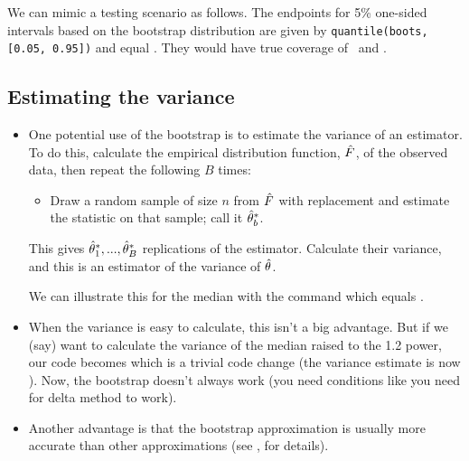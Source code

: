 \begin{itemize}[leftmargin=0pt]
  \renewcommand*\FancyVerbStartString{## block 1}

  We can mimic a testing scenario as follows.
  \renewcommand*\FancyVerbStartString{## block 3}
  The endpoints for 5\% one-sided intervals based on the bootstrap
  distribution are given by \verb|quantile(boots, [0.05, 0.95])| and
  equal \bootquantiles.  They would have true coverage of \bootleft\
  and \bootright.

\end{itemize}

\subsection{Estimating the variance}

\begin{itemize}[leftmargin=0pt]

\item One potential use of the bootstrap is to estimate the variance
  of an estimator.  To do this, calculate the empirical distribution
  function, $\hat{F}$, of the observed data, then repeat the following $B$
  times:
  \begin{itemize}
  \item Draw a random sample of size $n$ from $\hat{F}$ with replacement
    and estimate the statistic on that sample; call it $\hat{\theta}^*_b$.
  \end{itemize}
  This gives $\hat{\theta}^*_1,...,\hat{\theta}^*_B$ replications of the estimator.
  Calculate their variance, and this is an estimator of the variance
  of $\hat{\theta}$.

  We can illustrate this for the median with the command
  \renewcommand*\FancyVerbStartString{## block 4}
  which equals \medv.

\item When the variance is easy to calculate, this isn't a big
  advantage.  But if we (say) want to calculate the variance of the
  median raised to the 1.2 power, our code becomes
  \renewcommand*\FancyVerbStartString{## block 5}
  which is a trivial code change (the variance estimate is now \powv).
  Now, the bootstrap doesn't always work (you need conditions like you
  need for delta method to work).

\item Another advantage is that the bootstrap approximation is usually
  more accurate than other approximations (see \citealp{Hal91}, for
  details).

\end{itemize}

